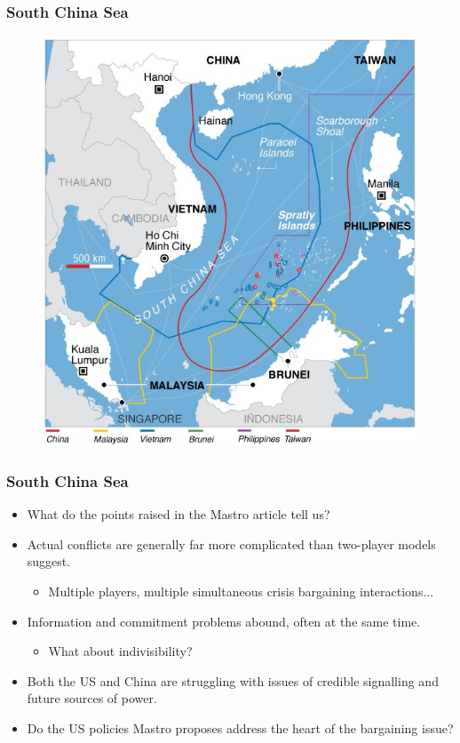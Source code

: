 \documentclass{beamer}
\begin{document}
\begin{frame} 
	\frametitle{\LARGE{South China Sea}}
	\begin{figure}[ht!]
		\centering
		\includegraphics[width=\textwidth,height=0.8\textheight,keepaspectratio]{South_China_Sea_claims_map.jpg}
	\end{figure}
\end{frame}

\begin{frame} 
	\frametitle{\LARGE{South China Sea}}
	\begin{itemize}
		\item What do the points raised in the Mastro article tell us? \pause
		\item Actual conflicts are generally far more complicated than two-player models suggest. \pause
		\begin{itemize}
			\item Multiple players, multiple simultaneous crisis bargaining interactions... \pause
		\end{itemize}
		\item Information and commitment problems abound, often at the same time. \pause  
		\begin{itemize}
			\item What about indivisibility? \pause
		\end{itemize}
		\item Both the US and China are struggling with issues of credible signalling and future sources of power. \pause 
		\item Do the US policies Mastro proposes address the heart of the bargaining issue? 
	\end{itemize}
\end{frame}
\end{document}
